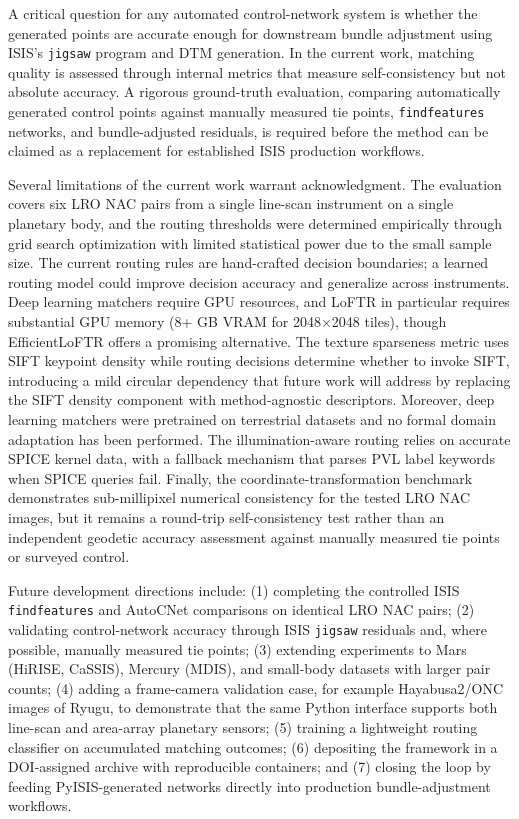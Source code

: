 \documentclass[lettersize,journal]{IEEEtran}
\newcommand{\pyisis}{PyISIS}
\begin{document}
A critical question for any automated control-network system is whether the generated points are accurate enough for downstream bundle adjustment using ISIS's \texttt{jigsaw} program and DTM generation. In the current work, matching quality is assessed through internal metrics that measure self-consistency but not absolute accuracy. A rigorous ground-truth evaluation, comparing automatically generated control points against manually measured tie points, \texttt{findfeatures} networks, and bundle-adjusted residuals, is required before the method can be claimed as a replacement for established ISIS production workflows.

Several limitations of the current work warrant acknowledgment. The evaluation covers six LRO NAC pairs from a single line-scan instrument on a single planetary body, and the routing thresholds were determined empirically through grid search optimization with limited statistical power due to the small sample size. The current routing rules are hand-crafted decision boundaries; a learned routing model could improve decision accuracy and generalize across instruments. Deep learning matchers require GPU resources, and LoFTR in particular requires substantial GPU memory (8+ GB VRAM for 2048$\times$2048 tiles), though EfficientLoFTR \cite{wang2024efficientloftr} offers a promising alternative. The texture sparseness metric uses SIFT keypoint density while routing decisions determine whether to invoke SIFT, introducing a mild circular dependency that future work will address by replacing the SIFT density component with method-agnostic descriptors. Moreover, deep learning matchers were pretrained on terrestrial datasets and no formal domain adaptation has been performed. The illumination-aware routing relies on accurate SPICE kernel data, with a fallback mechanism that parses PVL label keywords when SPICE queries fail. Finally, the coordinate-transformation benchmark demonstrates sub-millipixel numerical consistency for the tested LRO NAC images, but it remains a round-trip self-consistency test rather than an independent geodetic accuracy assessment against manually measured tie points or surveyed control.

Future development directions include: (1) completing the controlled ISIS \texttt{findfeatures} and AutoCNet comparisons on identical LRO NAC pairs; (2) validating control-network accuracy through ISIS \texttt{jigsaw} residuals and, where possible, manually measured tie points; (3) extending experiments to Mars (HiRISE, CaSSIS), Mercury (MDIS), and small-body datasets with larger pair counts; (4) adding a frame-camera validation case, for example Hayabusa2/ONC images of Ryugu, to demonstrate that the same Python interface supports both line-scan and area-array planetary sensors; (5) training a lightweight routing classifier on accumulated matching outcomes; (6) depositing the framework in a DOI-assigned archive with reproducible containers; and (7) closing the loop by feeding \pyisis{}-generated networks directly into production bundle-adjustment workflows.
\end{document}
